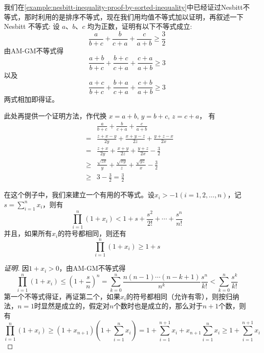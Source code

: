\begin{example}
  \label{example:nesbitt-inequality-proof-by-am-gm-inequality}
  我们在\autoref{example:nesbitt-inequality-proof-by-sorted-inequality}中已经证过Nesbitt不等式，那时利用的是排序不等式，现在我们用均值不等式加以证明，再叙述一下 Nesbitt 不等式: 设 $a$、$b$、$c$ 均为正数，证明有以下不等式成立:
  \[ \frac{a}{b+c} + \frac{b}{c+a} + \frac{c}{a+b} \geqslant \frac{3}{2} \]
  由AM-GM不等式得
  \[ \frac{a+b}{b+c}+\frac{b+c}{c+a}+\frac{c+a}{a+b} \geqslant 3 \]
以及
\[ \frac{a+c}{b+c}+\frac{b+a}{c+a}+\frac{c+b}{a+b} \geqslant 3 \]
两式相加即得证。

此处再提供一个证明方法，作代换 $x=a+b$, $y=b+c$, $z=c+a$， 有
\begin{eqnarray*}
  & & \frac{a}{b+c} + \frac{b}{c+a} + \frac{c}{a+b} \\
  & = & \frac{z+x-y}{2y} + \frac{x+y-z}{2z} + \frac{y+z-x}{2x} \\
  & = & \frac{z+x}{2y} + \frac{x+y}{2z} + \frac{y+z}{2x} - \frac{3}{2} \\
  & \geqslant & \frac{\sqrt{zx}}{y} + \frac{\sqrt{xy}}{z} + \frac{\sqrt{yz}}{x} - \frac{3}{2} \\
  & \geqslant & 3-\frac{3}{2} = \frac{3}{2}
\end{eqnarray*}
\end{example}

\begin{example}
  在这个例子中，我们来建立一个有用的不等式。设$x_i > -1(i=1,2,\ldots,n)$，记$s=\sum_{i=1}^nx_i$，则有
  \[ \prod_{i=1}^n(1+x_i) < 1+s+\frac{s^2}{2!}+\cdots+\frac{s^n}{n!} \]
  并且，如果所有$x_i$的符号都相同，则还有
  \[ \prod_{i=1}^n(1+x_i) \geqslant 1+s \]
  \begin{proof}[证明]
    因$1+x_i>0$，由AM-GM不等式得
    \[ \prod_{i=1}^n(1+x_i) \leqslant \left( 1+\frac{s}{n} \right)^n = \sum_{k=0}^n \frac{n(n-1)\cdots(n-k+1)}{n^k} \frac{s^n}{k!} < \sum_{k=0}^n \frac{s^k}{k!}  \]
    第一个不等式得证，再证第二个，如果$x_i$的符号都相同（允许有零），则按归纳法，$n=1$时显然是成立的，假定对$n$个数时也是成立的，那么对于$n+1$个数，则有
    \[ \prod_{i=1}^n (1+x_i) \geqslant (1+x_{n+1})(1+\sum_{i=1}^nx_i) = 1+\sum_{i=1}^{n+1}x_i + x_{n+1}\sum_{i=1}^nx_i \geqslant 1+\sum_{i=1}^{n+1}x_i \]
  \end{proof}
\end{example}

